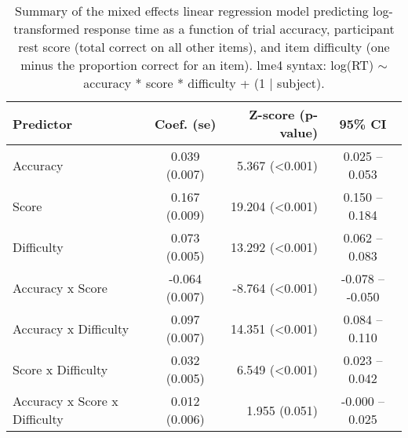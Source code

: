 \documentclass[a4paper,man,natbib]{apa6}
\begin{document}
\begin{table}[]
\centering
\begin{tabular*}{\textwidth}{lc@{\hskip 6mm}r@{\hskip 6mm}c}
\toprule
Predictor &  Coef. (se) & Z-score (p-value) & 95\% CI  \\
\midrule
Accuracy & 0.039 (0.007) &   5.367 (<0.001) &  0.025 -- 0.053  \\
Score &  0.167 (0.009) &  19.204 (<0.001) &  0.150 -- 0.184  \\
Difficulty & 0.073 (0.005) &  13.292 (<0.001) &  0.062 -- 0.083  \\
Accuracy x Score & -0.064 (0.007) &  -8.764 (<0.001) & -0.078 -- -0.050  \\
Accuracy x Difficulty & 0.097 (0.007) &  14.351 (<0.001) &  0.084 -- 0.110  \\
Score x Difficulty &  0.032 (0.005) &   6.549 (<0.001) &  0.023 -- 0.042  \\
Accuracy x Score x Difficulty &  0.012 (0.006) & 1.955 (0.051) & -0.000 -- 0.025  \\
\bottomrule
\end{tabular*}
\caption{\label{table:1}\normalfont Summary of the mixed effects linear regression model predicting log-transformed response time as a function of trial accuracy, participant rest score (total correct on all other items), and item difficulty (one minus the proportion correct for an item). \newline lme4 syntax: log(RT) $\sim$ accuracy * score * difficulty + (1 | subject).}
\end{table}
\end{document}
